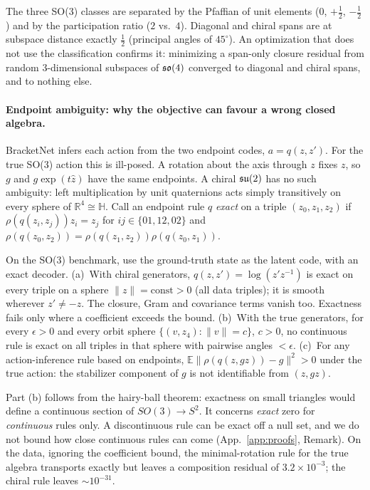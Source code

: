 The three SO(3) classes are separated by the Pfaffian of unit elements ($0$, $+\frac12$, $-\frac12$) and by the
participation ratio ($2$ vs.\ $4$). Diagonal and chiral spans are at subspace distance exactly $\frac12$ (principal
angles of $45^\circ$). An optimization that does not use the classification confirms it: minimizing a span-only
closure residual from \RFlowN{} random 3-dimensional subspaces of $\mathfrak{so}(4)$ converged to \RFlowDiag{} diagonal and
\RFlowChiral{} chiral spans, and to nothing else.

\paragraph{Endpoint ambiguity: why the objective can favour a wrong closed algebra.}
BracketNet infers each action from the two endpoint codes, $a=q(z,z')$. For the true SO(3) action this is
ill-posed. A rotation about the axis through $z$ fixes $z$, so $g$ and $g\exp(t\hat z)$ have the same endpoints. A
chiral $\mathfrak{su}(2)$ has no such ambiguity: left multiplication by unit quaternions acts simply transitively on every
sphere of $\mathbb R^4\cong\mathbb H$. Call an endpoint rule $q$ \emph{exact} on a triple $(z_0,z_1,z_2)$ if
$\rho(q(z_i,z_j))z_i=z_j$ for $ij\in\{01,12,02\}$ and $\rho(q(z_0,z_2))=\rho(q(z_1,z_2))\rho(q(z_0,z_1))$.

\begin{proposition}\label{prop:endpoint}
On the SO(3) benchmark, use the ground-truth state as the latent code, with an exact decoder.
(a)~With chiral generators, $q(z,z')=\log(z'z^{-1})$ is exact on every triple on a sphere $\|z\|=\text{const}>0$ (all data triples); it is smooth wherever $z'\neq-z$.
The closure, Gram and covariance terms vanish too. Exactness fails only where a coefficient exceeds the bound.
(b)~With the true generators, for every $\epsilon>0$ and every orbit sphere $\{(v,z_4):\|v\|=c\}$, $c>0$, no
continuous rule is exact on all triples in that sphere with pairwise angles $<\epsilon$.
(c)~For any action-inference rule based on endpoints, $\mathbb E\|\rho(q(z,gz))-g\|^2>0$ under the true action:
the stabilizer component of $g$ is not identifiable from $(z,gz)$.
\end{proposition}

Part (b) follows from the hairy-ball theorem: exactness on small triangles would define a continuous section of
$SO(3)\to S^2$. It concerns \emph{exact} zero for \emph{continuous} rules only. A discontinuous rule can be exact
off a null set, and we do not bound how close continuous rules can come (App.~\ref{app:proofs}, Remark). On the data,
ignoring the coefficient bound, the minimal-rotation rule for the true algebra transports exactly but leaves a
composition residual of $3.2\times10^{-3}$; the chiral rule leaves ${\sim}10^{-31}$.

